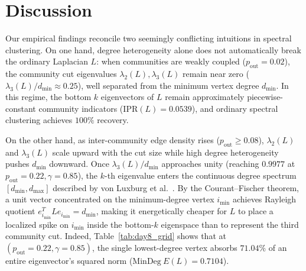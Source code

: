 \documentclass[10pt,twocolumn,a4paper]{article}
\begin{document}
\section{Discussion}
Our empirical findings reconcile two seemingly conflicting intuitions in spectral clustering. On one hand, degree heterogeneity alone does not automatically break the ordinary Laplacian $L$: when communities are weakly coupled ($p_{\mathrm{out}}=0.02$), the community cut eigenvalues $\lambda_2(L), \lambda_3(L)$ remain near zero ($\lambda_3(L)/d_{\min} \approx 0.25$), well separated from the minimum vertex degree $d_{\min}$. In this regime, the bottom $k$ eigenvectors of $L$ remain approximately piecewise-constant community indicators ($\mathrm{IPR}(L) = 0.0539$), and ordinary spectral clustering achieves $100\%$ recovery.

On the other hand, as inter-community edge density rises ($p_{\mathrm{out}} \ge 0.08$), $\lambda_2(L)$ and $\lambda_3(L)$ scale upward with the cut size while high degree heterogeneity pushes $d_{\min}$ downward. Once $\lambda_3(L)/d_{\min}$ approaches unity (reaching $0.9977$ at $p_{\mathrm{out}}=0.22, \gamma=0.85$), the $k$-th eigenvalue enters the continuous degree spectrum $[d_{\min}, d_{\max}]$ described by von Luxburg et al.\ \cite{vonluxburg2008consistency}. By the Courant--Fischer theorem, a unit vector concentrated on the minimum-degree vertex $i_{\min}$ achieves Rayleigh quotient $e_{i_{\min}}^T L e_{i_{\min}} = d_{\min}$, making it energetically cheaper for $L$ to place a localized spike on $i_{\min}$ inside the bottom-$k$ eigenspace than to represent the third community cut. Indeed, Table~\ref{tab:day8_grid} shows that at $(p_{\mathrm{out}}=0.22, \gamma=0.85)$, the single lowest-degree vertex absorbs $71.04\%$ of an entire eigenvector's squared norm ($\mathrm{MinDeg\ }E(L) = 0.7104$).
\end{document}
